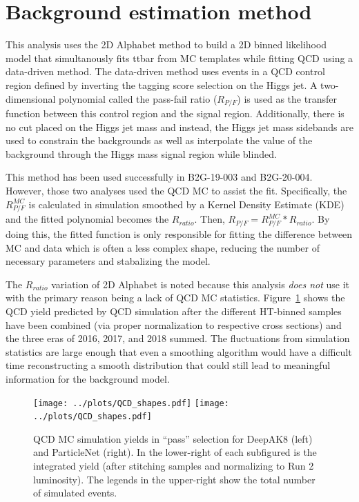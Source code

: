 \documentclass[10pt,oneside]{article}
\begin{document}
\section{Background estimation method}

This analysis uses the 2D Alphabet method to build a 2D binned likelihood model that simultanously fits
ttbar from MC templates while fitting QCD using a data-driven method. The data-driven method uses
events in a QCD control region defined by inverting the tagging score selection on the Higgs jet.
A two-dimensional polynomial called the pass-fail ratio ($R_{P/F}$) is used as the transfer function between this control region and the signal
region. Additionally, there is no cut placed on the Higgs jet mass and instead, the Higgs jet mass sidebands
are used to constrain the backgrounds as well as interpolate the value of the background through the Higgs
mass signal region while blinded.

This method has been used successfully in B2G-19-003 and B2G-20-004. However, those two analyses used the 
QCD MC to assist the fit. Specifically, the $R_{P/F}^{MC}$ is calculated in simulation smoothed by a Kernel Density Estimate (KDE)
and the fitted polynomial becomes the $R_{ratio}$. Then, $R_{P/F} = R_{P/F}^{MC} * R_{ratio}$. By doing this, the fitted function
is only responsible for fitting the difference between MC and data which is often a less complex shape, reducing the number of necessary
parameters and stabalizing the model.

The $R_{ratio}$ variation of 2D Alphabet is noted because this analysis \textit{does not} use it 
with the primary reason being a lack of QCD MC statistics. Figure~\ref{figs:QCDSR} shows the 
QCD yield predicted by QCD simulation after the different HT-binned samples have been combined (via proper
normalization to respective cross sections) and the three eras of 2016, 2017, and 2018 summed. The fluctuations from simulation statistics 
are large enough that even a smoothing algorithm would have a difficult time reconstructing a smooth distribution
that could still lead to meaningful information for the background model.

\begin{figure}
    \centering
    \texttt{[image: ../plots/QCD\_shapes.pdf]}
    \texttt{[image: ../plots/QCD\_shapes.pdf]}
    \caption{QCD MC simulation yields in ``pass'' selection for DeepAK8 (left) and ParticleNet (right). In the lower-right
    of each subfigured is the integrated yield (after stitching samples and normalizing to Run 2 luminosity). The legends
    in the upper-right show the total number of simulated events.}
    \label{figs:QCDSR}
\end{figure}
\end{document}
